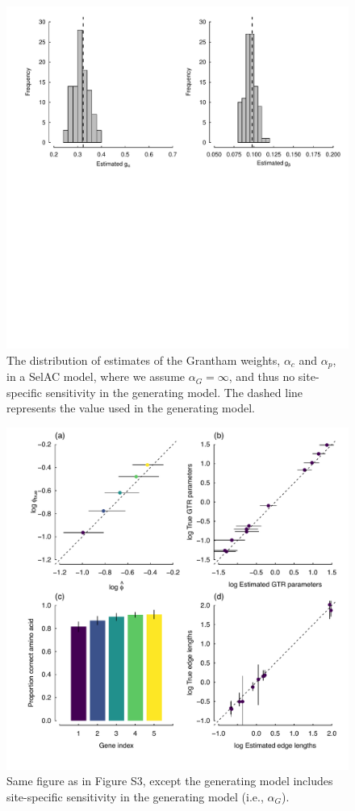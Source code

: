 \documentclass{article}
\newcommand{\alphac}{\ensuremath{\alpha_c}\xspace}
\newcommand{\alphag}{\ensuremath{\alpha_G}\xspace}
\newcommand{\alphap}{\ensuremath{\alpha_p}\xspace}
\begin{document}
\begin{figure}[H]
  \centering
  \includegraphics[width=0.9\linewidth]{FIGURE_S4_5genes_alpha.beta_UNREST_Selac_NoG.pdf}
  \caption{The distribution of estimates of the Grantham weights, $\alphac$ and $\alphap$, in a SelAC model, where we assume $\alphag = \infty$, and thus no site-specific sensitivity in the generating model.
  		The dashed line represents the value used in the generating model. 
  } 
  \label{fig:SelacNoGSimRes2}
\end{figure}

\begin{figure}[H]
  \centering
  \includegraphics[width=0.9\linewidth]{FIGURE_S5_5genes_All_UNREST_WITHGAMMA.pdf}
  \caption{Same figure as in Figure S3, except the generating model includes site-specific sensitivity in the generating model (i.e., $\alphag$).
  } 
  \label{fig:SelacWithGSimRes}
\end{figure}
\end{document}
